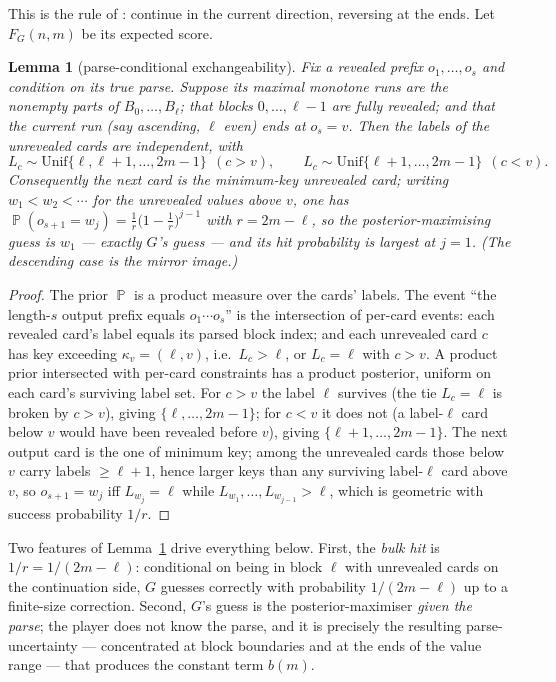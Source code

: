 \documentclass[11pt]{article}
\newtheorem{lemma}[theorem]{Lemma}
\theoremstyle{definition}
\DeclareMathOperator{\PP}{\mathbb{P}}
\newcommand{\Fg}{F_G}
\begin{document}
This is the rule of \cite{DFH}: continue in the current direction, reversing at the ends. Let
$\Fg(n,m)$ be its expected score.

\begin{lemma}[parse-conditional exchangeability]\label{lem:key}
Fix a revealed prefix $o_1,\dots,o_s$ and condition on its true parse. Suppose its maximal
monotone runs are the nonempty parts of $B_0,\dots,B_\ell$; that blocks $0,\dots,\ell-1$ are
fully revealed; and that the current run (say ascending, $\ell$ even) ends at $o_s=v$. Then the
labels of the unrevealed cards are independent, with
\[
  L_c\sim \mathrm{Unif}\{\ell,\ell+1,\dots,2m-1\}\ \ (c>v),\qquad
  L_c\sim \mathrm{Unif}\{\ell+1,\dots,2m-1\}\ \ (c<v).
\]
Consequently the next card is the minimum-key unrevealed card; writing $w_1<w_2<\cdots$ for the
unrevealed values above $v$, one has $\PP(o_{s+1}=w_j)=\frac1r\bigl(1-\frac1r\bigr)^{j-1}$ with
$r=2m-\ell$, so the posterior-maximising guess is $w_1$ --- exactly $G$'s guess --- and its hit
probability is largest at $j=1$. (The descending case is the mirror image.)
\end{lemma}

\begin{proof}
The prior $\PP$ is a product measure over the cards' labels. The event ``the length-$s$ output
prefix equals $o_1\cdots o_s$'' is the intersection of per-card events: each revealed card's
label equals its parsed block index; and each unrevealed card $c$ has key exceeding
$\kappa_v=(\ell,v)$, i.e.\ $L_c>\ell$, or $L_c=\ell$ with $c>v$. A product prior intersected
with per-card constraints has a product posterior, uniform on each card's surviving label set.
For $c>v$ the label $\ell$ survives (the tie $L_c=\ell$ is broken by $c>v$), giving
$\{\ell,\dots,2m-1\}$; for $c<v$ it does not (a label-$\ell$ card below $v$ would have been
revealed before $v$), giving $\{\ell+1,\dots,2m-1\}$. The next output card is the one of
minimum key; among the unrevealed cards those below $v$ carry labels $\ge\ell+1$, hence larger
keys than any surviving label-$\ell$ card above $v$, so $o_{s+1}=w_j$ iff $L_{w_j}=\ell$ while
$L_{w_1},\dots,L_{w_{j-1}}>\ell$, which is geometric with success probability
$1/r$.\end{proof}

Two features of Lemma~\ref{lem:key} drive everything below. First, the \emph{bulk hit} is
$1/r=1/(2m-\ell)$: conditional on being in block $\ell$ with unrevealed cards on the
continuation side, $G$ guesses correctly with probability $1/(2m-\ell)$ up to a finite-size
correction. Second, $G$'s guess is the posterior-maximiser \emph{given the parse}; the player
does not know the parse, and it is precisely the resulting parse-uncertainty --- concentrated
at block boundaries and at the ends of the value range --- that produces the constant term
$b(m)$.
\end{document}
